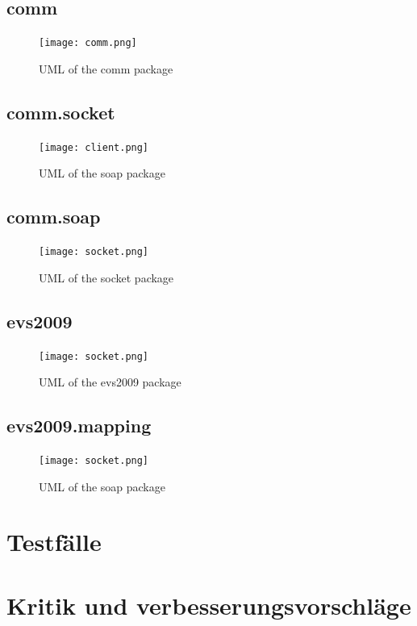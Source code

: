 \documentclass[a4paper]{article}
\begin{document}
	\subsection{comm}
	\begin{figure}[here!]
	\centering
	\texttt{[image: comm.png]}
	\caption{UML of the comm package}
	\end{figure}
	\subsection{comm.socket}
	\begin{figure}[here!]
	\centering
	\texttt{[image: client.png]}
	\caption{UML of the soap package}
	\end{figure}
	\subsection{comm.soap}
	\begin{figure}[here!]
	\centering
	\texttt{[image: socket.png]}
	\caption{UML of the socket package}
	\end{figure}
	\subsection{evs2009}
	\begin{figure}[here!]
	\centering
	\texttt{[image: socket.png]}
	\caption{UML of the evs2009 package}
	\end{figure}
	\subsection{evs2009.mapping}
	\begin{figure}[here!]
	\centering
	\texttt{[image: socket.png]}
	\caption{UML of the soap package}
	\end{figure}
\section{Testfälle}
\section{Kritik und verbesserungsvorschläge}

\newpage
{}

		
\end{document}
